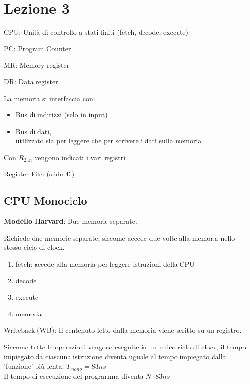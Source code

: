 \documentclass[../ace.tex]{subfiles}
\begin{document}
\section{Lezione 3}
CPU: Unità di controllo a stati finiti (fetch, decode, execute)

PC: Program Counter

MR: Memory register

DR: Data register

La memoria si interfaccia con:
\begin{itemize}
    \item Bus di indirizzi (solo in input)
    \item Bus di dati, \\utilizzato sia per leggere che per scrivere i dati sulla memoria
\end{itemize}

Con $R_{2..n}$ vengono indicati i vari registri

Register File: (slide 43)

\subsection{CPU Monociclo}
\textbf{Modello Harvard}: Due memorie separate.%

Richiede due memorie separate, siccome accede due volte alla memoria nello stesso ciclo di clock.

\begin{enumerate}
    \item fetch: accede alla memoria per leggere istruzioni della CPU
    \item decode
    \item execute
    \item memoria
\end{enumerate}

Writeback (WB): Il contenuto letto dalla memoria viene scritto su un registro.

Siccome tutte le operazioni vengono eseguite in un unico ciclo di clock, il tempo impiegato da ciascuna istruzione diventa uguale al tempo impiegato dalla 'funzione' più lenta: $T_{mono} = 83 ns$.
\\
Il tempo di esecuzione del programma diventa $N \cdot 83ns$
\end{document}
